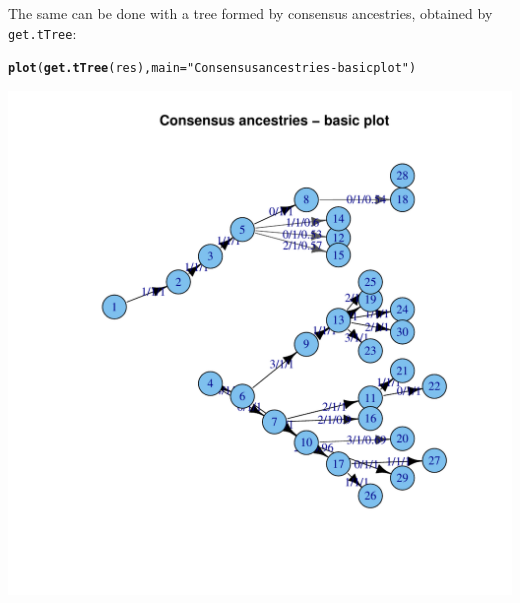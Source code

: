 \documentclass{article}\usepackage[]{graphicx}\usepackage[]{color}
\makeatletter
\newcommand{\hlstr}[1]{\textcolor[rgb]{0.192,0.494,0.8}{#1}}%
\newcommand{\hlstd}[1]{\textcolor[rgb]{0.345,0.345,0.345}{#1}}%
\newcommand{\hlkwc}[1]{\textcolor[rgb]{0.333,0.667,0.333}{#1}}%
\newcommand{\hlkwd}[1]{\textcolor[rgb]{0.737,0.353,0.396}{\textbf{#1}}}%
\newenvironment{kframe}{%
 \def\at@end@of@kframe{}%
 \ifinner\ifhmode%
  \def\at@end@of@kframe{\end{minipage}}%
  \begin{minipage}{\columnwidth}%
 \fi\fi%
 \def\FrameCommand##1{\hskip\@totalleftmargin \hskip-\fboxsep
 \colorbox{shadecolor}{##1}\hskip-\fboxsep
     \hskip-\linewidth \hskip-\@totalleftmargin \hskip\columnwidth}%
 \MakeFramed {\advance\hsize-\width
   \@totalleftmargin\z@ \linewidth\hsize
   \@setminipage}}%
 {\par\unskip\endMakeFramed%
 \at@end@of@kframe}
\newenvironment{knitrout}{}{} %
\makeatother
\begin{document}
The same can be done with a tree formed by consensus ancestries, obtained by \texttt{get.tTree}:
\begin{knitrout}
\color{fgcolor}\begin{kframe}
\begin{alltt}
\hlkwd{plot}\hlstd{(}\hlkwd{get.tTree}\hlstd{(res),} \hlkwc{main}\hlstd{=}\hlstr{"Consensus ancestries - basic plot"}\hlstd{)}
\end{alltt}
\end{kframe}

{\centering \includegraphics[width=.6\textwidth]{figs/unnamed-chunk-25} 

}



\end{knitrout}
\end{document}
